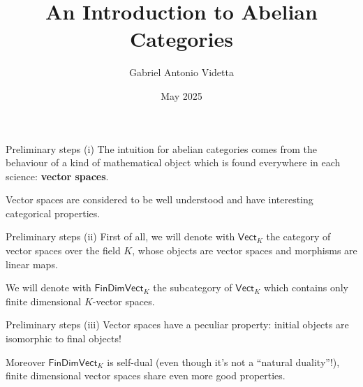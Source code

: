 \documentclass{beamer}
\title{An Introduction to Abelian Categories}
\author{Gabriel Antonio Videtta}
\date{May 2025}
\newcommand{\cat}[1]{\mathsf{#1}}
\begin{document}
\begin{frame}
    \titlepage
\end{frame}

\begin{frame}{Preliminary steps (i)}
    The intuition for abelian categories comes from the
    behaviour of a kind of
    mathematical object which is found
    everywhere in each science: \textbf{vector spaces}. \bigskip


    Vector spaces are considered to be well understood
    and have interesting categorical properties.
\end{frame}

\begin{frame}{Preliminary steps (ii)}
    First of all, we will denote with $\cat{Vect}_K$ the category
    of vector spaces over the field $K$, whose objects are vector spaces and
    morphisms are linear maps. \bigskip


    We will denote with $\cat{FinDimVect}_K$ the subcategory
    of $\cat{Vect}_K$ which contains only finite dimensional
    $K$-vector spaces.
\end{frame}

\begin{frame}{Preliminary steps (iii)}
    Vector spaces have a peculiar property: initial objects are
    isomorphic to final objects! \medskip
    
    Moreover $\cat{FinDimVect}_K$ is self-dual (even though
    it's not a ``natural duality''!), finite dimensional
    vector spaces share even more good properties.
\end{frame}
\end{document}
